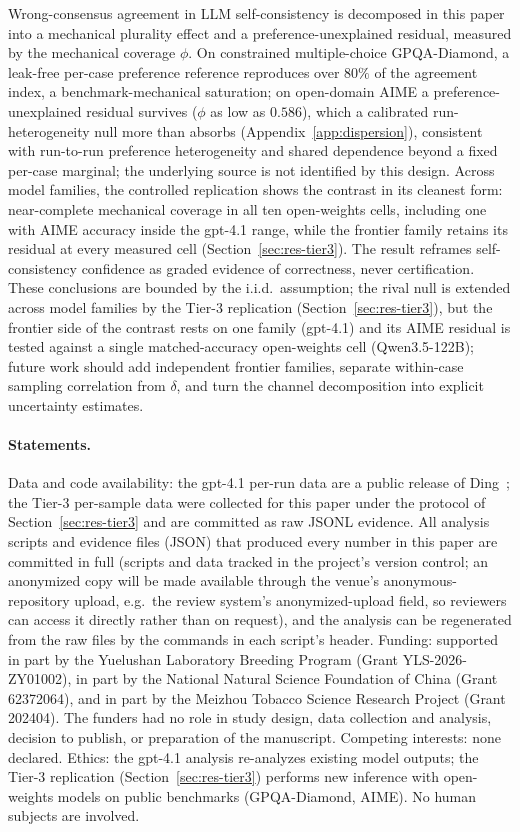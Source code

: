 \documentclass{article}
\begin{document}
Wrong-consensus agreement in LLM self-consistency is decomposed in this paper into a
mechanical plurality effect and a preference-unexplained residual,
measured by the mechanical coverage $\phi$. On constrained
multiple-choice GPQA-Diamond, a leak-free per-case preference reference
reproduces over $80\%$ of the agreement index, a benchmark-mechanical
saturation; on open-domain AIME a preference-unexplained residual
survives ($\phi$ as low as $0.586$), which a calibrated run-heterogeneity
null more than absorbs (Appendix~\ref{app:dispersion}), consistent with
run-to-run preference heterogeneity and shared dependence beyond a fixed
per-case marginal; the underlying source is not identified by this design. Across model families,
the controlled replication shows the contrast in its cleanest form:
near-complete mechanical coverage in all ten open-weights cells,
including one with AIME accuracy inside the gpt-4.1 range, while the frontier
family retains its residual at every measured cell
(Section~\ref{sec:res-tier3}). The result reframes
self-consistency confidence as graded evidence of correctness, never
certification. These conclusions are bounded by the i.i.d.\ assumption;
the rival null is extended across model families by the Tier-3
replication (Section~\ref{sec:res-tier3}), but the frontier side of the
contrast rests on one family (gpt-4.1) and its AIME residual is tested
against a single matched-accuracy open-weights cell
(Qwen3.5-122B); future work should add independent frontier families,
separate within-case sampling correlation from $\delta$, and turn
the channel decomposition into explicit uncertainty estimates.

\paragraph{Statements.}
Data and code availability: the gpt-4.1 per-run data are a public
release of Ding~\cite{ding2026auditing}; the Tier-3 per-sample data were
collected for this paper under the protocol of
Section~\ref{sec:res-tier3} and are committed as raw JSONL evidence.
All analysis scripts and evidence
files (JSON) that produced every number in this paper are committed in full (scripts and data tracked in the project's version control; an anonymized copy will be made available through the venue's anonymous-repository upload, e.g.\ the review system's anonymized-upload field, so reviewers can access it directly rather than on request),
and the analysis can be regenerated from the raw files
by the commands in each script's header. Funding: supported in part
by the Yuelushan Laboratory Breeding Program (Grant YLS-2026-ZY01002), in
part by the National Natural Science Foundation of China (Grant
62372064), and in part by the Meizhou Tobacco Science Research Project
(Grant 202404). The funders had no role in study design, data collection
and analysis, decision to publish, or preparation of the manuscript.
Competing interests: none declared. Ethics: the gpt-4.1 analysis
re-analyzes existing model outputs; the Tier-3 replication
(Section~\ref{sec:res-tier3}) performs new inference with open-weights
models on public benchmarks (GPQA-Diamond, AIME). No human subjects are
involved.
\end{document}
